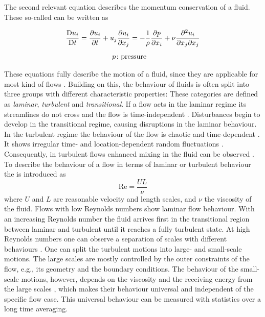 The second relevant equation describes the momentum conservation of a fluid.
These so-called  can be written as 

\begin{gather}
    \frac{\mathrm{D}u_i}{\mathrm{D}t} = \frac{\partial u_i}{\partial t} + u_j \frac{\partial u_i}{\partial x_j} = -\frac{1}{\rho} \frac{\partial p}{\partial x_i} + \nu \frac{\partial^2 u_i}{\partial x_j \partial x_j} \\[4pt]
    \begin{aligned}
        p &\colon \text{pressure}
    \end{aligned} \notag
\end{gather}

These equations fully describe the motion of a fluid, since they are applicable for most kind of flows \citep{batchelor_introduction_2000}.
Building on this, the behaviour of fluids is often split into three groups with different characteristic properties:
These categories are defined as \emph{laminar},  \emph{turbulent} and  \emph{transitional}. 
If a flow acts in the laminar regime its streamlines do not cross and the flow is time-independent \citep{davidson_turbulence_2015}.
Disturbances begin to develop in the transitional regime, causing disruptions in the laminar behaviour.
In the turbulent regime the behaviour of the flow is chaotic and time-dependent \citep{schlichting_boundary-layer_2017}.
It shows irregular time- and location-dependent random fluctuations \citep{pope_turbulent_2015}.
Consequently, in turbulent flows enhanced mixing in the fluid can be observed \citep{pope_turbulent_2015}.
To describe the behaviour of a flow in terms of laminar or turbulent behaviour the  is introduced as 
\begin{equation}
    \mathrm{Re} = \frac{U L}{\nu}
\end{equation}
where $U$ and $L$ are reasonable velocity and length scales, and $\nu$ the viscosity of the fluid.
Flows with low Reynolds numbers show laminar flow behaviour.
With an increasing Reynolds number the fluid arrives first in the transitional region between laminar and turbulent until it reaches a fully turbulent state.
At high Reynolds numbers one can observe a separation of scales with different behaviours \citep{pope_turbulent_2015}.
One can split the turbulent motions into large- and small-scale motions.
The large scales are mostly controlled by the outer constraints of the flow, e.g., its geometry and the boundary conditions.
The behaviour of the small-scale motions, however, depends on the viscosity and the receiving energy from the large scales \citep{pope_turbulent_2015}, which makes their behaviour universal and independent of the specific flow case.
This universal behaviour can be measured with statistics over a long time averaging.

